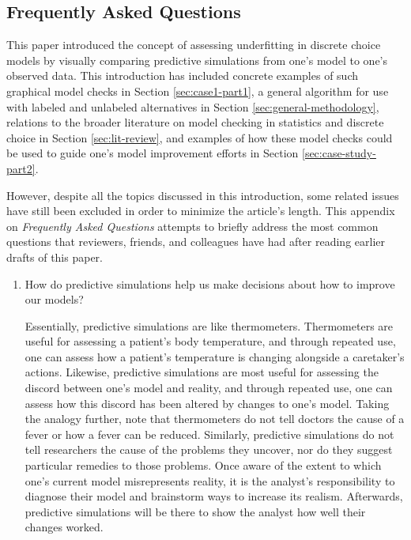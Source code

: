 \documentclass[preprint]{elsarticle}
\newenvironment{QandA}{\begin{enumerate}[label=\bfseries\alph*.]\bfseries}
                      {\end{enumerate}}
\newenvironment{answered}{\par\normalfont}{}
\begin{document}
\newpage
\begin{appendices}

\section{Frequently Asked Questions}
\label{sec:freq-questions}
This paper introduced the concept of assessing underfitting in discrete choice models by visually comparing predictive simulations from one's model to one's observed data. This introduction has included concrete examples of such graphical model checks in Section \ref{sec:case1-part1}, a general algorithm for use with labeled and unlabeled alternatives in Section \ref{sec:general-methodology}, relations to the broader literature on model checking in statistics and discrete choice in Section \ref{sec:lit-review}, and examples of how these model checks could be used to guide one's model improvement efforts in Section \ref{sec:case-study-part2}.

However, despite all the topics discussed in this introduction, some related issues have still been excluded in order to minimize the article's length. This appendix on \textit{Frequently Asked Questions} attempts to briefly address the most common questions that reviewers, friends, and colleagues have had after reading earlier drafts of this paper.

\begin{QandA}
   \item How do predictive simulations help us make decisions about how to improve our models?
       \begin{answered}
           Essentially, predictive simulations are like thermometers. Thermometers are useful for assessing a patient's body temperature, and through repeated use, one can assess how a patient's temperature is changing alongside a caretaker's actions. Likewise, predictive simulations are most useful for assessing the discord between one's model and reality, and through repeated use, one can assess how this discord has been altered by changes to one's model. Taking the analogy further, note that thermometers do not tell doctors the cause of a fever or how a fever can be reduced. Similarly, predictive simulations do not tell researchers the cause of the problems they uncover, nor do they suggest particular remedies to those problems. Once aware of the extent to which one's current model misrepresents reality, it is the analyst's responsibility to diagnose their model and brainstorm ways to increase its realism. Afterwards, predictive simulations will be there to show the analyst how well their changes worked.
       \end{answered}
       

\end{QandA}
\end{appendices}
\end{document}
